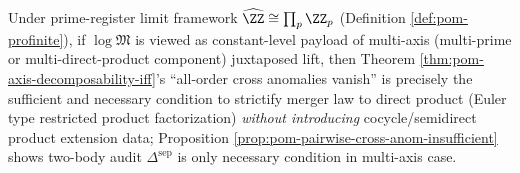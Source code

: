\begin{remark}\label{rem:pom-higher-cross-anom-euler}
Under prime-register limit framework \(\widehat{\ZZ}\cong\prod_p\ZZ_p\) (Definition \ref{def:pom-profinite}),
if \(\log\mathfrak{M}\) is viewed as constant-level payload of multi-axis (multi-prime or multi-direct-product component) juxtaposed lift,
then Theorem \ref{thm:pom-axis-decomposability-iff}'s ``all-order cross anomalies vanish''
is precisely the sufficient and necessary condition to strictify merger law to direct product (Euler type restricted product factorization) \emph{without introducing} cocycle/semidirect product extension data;
Proposition \ref{prop:pom-pairwise-cross-anom-insufficient} shows two-body audit \(\Delta^{\mathrm{sep}}\) is only necessary condition in multi-axis case.
\end{remark}

